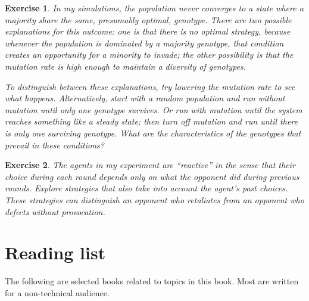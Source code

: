 \documentclass[12pt]{book}
\theoremstyle{exercise}
\newtheorem{exercise}{Exercise}[chapter]
\begin{document}
\begin{exercise}

In my simulations, the population never converges to a state where a majority share the same, presumably optimal, genotype. There are two possible explanations for this outcome: one is that there is no optimal strategy, because whenever the population is dominated by a majority genotype, that condition creates an opportunity for a minority to invade; the other possibility is that the mutation rate is high enough to maintain a diversity of genotypes.

To distinguish between these explanations, try lowering the mutation rate to see what happens. Alternatively, start with a random population and run without mutation until only one genotype survives. Or run with mutation until the system reaches something like a steady state; then turn off mutation and run until there is only one surviving genotype. What are the characteristics of the genotypes that prevail in these conditions?

\end{exercise}


\begin{exercise}

The agents in my experiment are ``reactive'' in the sense that their
choice during each round depends only on what the opponent did during
previous rounds.  Explore strategies that also take into
account the agent's past choices.  These strategies can
distinguish an opponent who retaliates from an opponent who defects
without provocation.


\end{exercise}



\appendix

\chapter{Reading list}
\label{reading}

The following are selected books related to topics in this book.  Most are written for a non-technical audience.
\end{document}
